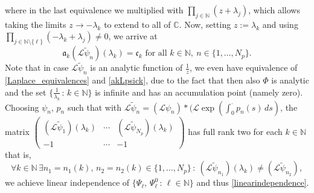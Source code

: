 \documentclass[12pt]{article}
\newcommand\contr{p}
\newcommand\Ncont{N_p}
\begin{document}
where in the last equivalence we multiplied with 
$\prod_{j\in\mathbb{N}}(z+\lambda_j)$, which allows taking the limits $z\to-\lambda_k$ to extend to all of $\mathbb{C}$. 
Now, setting $z:=\lambda_k$ and using $\prod_{j\in\mathbb{N}\setminus\{\ell\}}(-\lambda_k+\lambda_j)\not=0$, we arrive at
\begin{equation}\label{akLpsick}
\mathfrak{a}_k (\mathcal{L}\tilde{\psi}_n)(\lambda_k)=\mathfrak{c}_k\text{ for all }k\in\mathbb{N}, \ n\in\{1,\ldots,\Ncont\}.
\end{equation}
Note that in case $\mathcal{L}\tilde{\psi}_n$ is an analytic function of $\tfrac{1}{z}$, we even have equivalence of \eqref{Laplace_equivalences} and \eqref{akLpsick}, due to the fact that then also $\Phi$ is analytic and the set $\{\frac{1}{\lambda_k}\,:\,k\in\mathbb{N}\}$ is infinite and has an accumulation point (namely zero).
%
Choosing $\psi_n$, $\contr_n$ such that with 
$\mathcal{L}\tilde{\psi}_n=(\mathcal{L}\psi_n)*(\mathcal{L}\exp(\int_0^\cdot\contr_n(s)\, ds)$, the matrix {\small $\begin{pmatrix}
(\mathcal{L}\tilde{\psi}_1)(\lambda_k)
&\cdots&(\mathcal{L}\tilde{\psi}_{\Ncont})(\lambda_k)\\
-1&\cdots&-1
\end{pmatrix}$}
has full rank two for each $k\in\mathbb{N}$
that is,
\begin{equation}\label{fullrank}
\forall k\in\mathbb{N} \, \exists n_1=n_1(k),\,n_2=n_2(k)\in\{1,\ldots,\Ncont\}
\,:\ (\mathcal{L}\tilde{\psi}_{n_1})(\lambda_k)\not=(\mathcal{L}\tilde{\psi}_{n_2}),\end{equation}
we achieve linear independence of $\{\Psi_\ell,\,\Psi_\ell^0\,:\,\ell\in\mathbb{N}\}$ and thus \eqref{linearindependence}.
\end{document}
